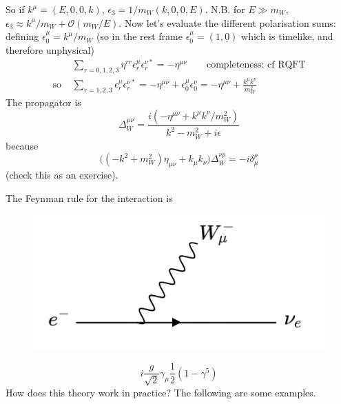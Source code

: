 So if $k^\mu = (E, 0, 0, k)$, $\epsilon_3 = 1/m_W(k,0,0,E)$. N.B. for $E \gg m_W$, $\epsilon_3 \approx k^\mu/m_W + \mathcal{O}(m_W/E)$. Now let's evaluate the different polarisation sums: defining $\epsilon_0^\mu = k^\mu/m_W$ (so in the rest frame $\epsilon_0^\mu = (1, \underline{0})$ which is timelike, and therefore unphysical)
\begin{equation}
\begin{split}
&\sum_{r=0,1,2,3}\eta^{rr}\epsilon_r^\mu \epsilon_r^{\nu *} = - \eta^{\mu \nu} \qquad \text{completeness: cf RQFT} \\
\text{so } &\sum_{r=1,2,3}\epsilon^\mu_r \epsilon_r^{\nu *} = -\eta^{\mu \nu} + \epsilon_0^\mu \epsilon_0^\nu = -\eta^{\mu\nu} + \frac{k^\mu k^\nu}{m_W^2}
\end{split}
\end{equation}
The propagator is 
\begin{equation}
\Delta^{\mu\nu}_W = \frac{i(-\eta^{\mu \nu} + k^\mu k^\nu/m_W^2)}{k^2-m_W^2 + i\epsilon}
\end{equation}
because
\begin{equation}
\big((-k^2 + m_W^2)\eta_{\mu\nu} + k_\mu k_\nu)\Delta^{\nu \rho}_W = -i\delta_\mu^\rho
\end{equation}
(check this as an exercise).

The Feynman rule for the interaction is
\newline
\begin{figure}
  \centering
  \includegraphics[width=\linewidth]{figs/17a.png}
\end{figure}
\begin{equation}
i\frac{g}{\sqrt{2}}\gamma_\mu\frac{1}{2}(1-\gamma^5)
\end{equation}
How does this theory work in practice? The following are some examples.
\newline
\newline
